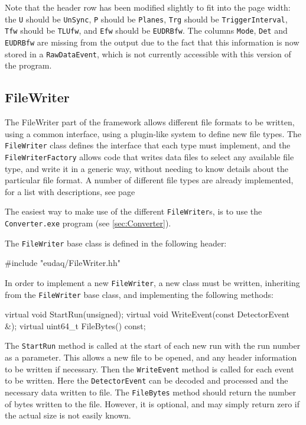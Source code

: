 Note that the header row has been modified slightly to fit into the page width:
the \texttt{U} should be \texttt{UnSync}, \texttt{P} should be \texttt{Planes},
\texttt{Trg} should be \texttt{TriggerInterval}, \texttt{Tfw} should be \texttt{TLUfw},
and \texttt{Efw} should be \texttt{EUDRBfw}.
The columns \texttt{Mode}, \texttt{Det} and \texttt{EUDRBfw} are missing from the output
due to the fact that this information is now stored in a \texttt{RawDataEvent},
which is not currently accessible with this version of the program.



\subsection{FileWriter}
The FileWriter part of the framework allows different file formats to be written,
using a common interface, using a plugin-like system to define new file types.
The \texttt{FileWriter} class defines the interface that each type must implement,
and the \texttt{FileWriterFactory} allows code that writes data files to select any
available file type, and write it in a generic way,
without needing to know details about the particular file format.
A number of different file types are already implemented,
for a list with descriptions, see page \pageref{lst:FileTypes}

The easiest way to make use of the different \texttt{FileWriter}s,
is to use the \texttt{Converter.exe} program (see \autoref{sec:Converter}).

The \texttt{FileWriter} base class is defined in the following header:
\begin{listing}
#include "eudaq/FileWriter.hh"
\end{listing}

In order to implement a new \texttt{FileWriter}, a new class must be written,
inheriting from the \texttt{FileWriter} base class, and implementing the following methods:
\begin{listing}
virtual void StartRun(unsigned);
virtual void WriteEvent(const DetectorEvent &);
virtual uint64_t FileBytes() const;
\end{listing}

The \texttt{StartRun} method is called at the start of each new run
with the run number as a parameter.
This allows a new file to be opened, and any header information to be written if necessary.
Then the \texttt{WriteEvent} method is called for each event to be written.
Here the \texttt{DetectorEvent} can be decoded and processed
and the necessary data written to file.
The \texttt{FileBytes} method should return the number of bytes written to the file.
However, it is optional, and may simply return zero if the actual size is not easily known.

